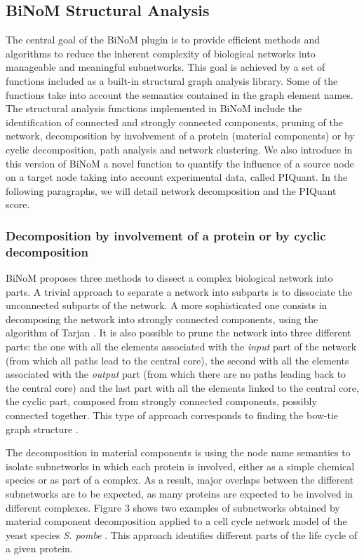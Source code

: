 \documentclass[10pt]{bmc_article}
\newenvironment{bmcformat}{\baselineskip20pt\sloppy\setboolean{publ}{false}}{\baselineskip20pt\sloppy}
\begin{document}
\begin{bmcformat}
\subsection*{BiNoM Structural Analysis}
The central goal of the BiNoM plugin is to provide efficient methods
and algorithms to reduce the inherent complexity of biological networks into
manageable and meaningful subnetworks. This goal is achieved by a set of
functions included as a built-in structural graph analysis library. Some of the functions take into
account the semantics contained in the graph element names.
The structural analysis functions implemented in BiNoM include the identification of
connected and strongly connected components, pruning of the network, decomposition
by involvement of a protein (material components) or by cyclic decomposition, path analysis and network clustering.
We also introduce in this version of BiNoM a novel function to quantify the
influence of a source node on a target node taking into account experimental
data, called PIQuant. In the following paragraphs, we will detail network
decomposition and the PIQuant score.

\subsubsection*{Decomposition by involvement of a protein or by cyclic decomposition}

BiNoM proposes three methods to dissect a complex biological network into parts.
A trivial approach to separate a network into subparts is to dissociate the unconnected subparts
of the network. A more sophisticated one consists in decomposing the network into
strongly connected components, using the algorithm of Tarjan
\cite{tarjan1972depth}. It is also possible to prune the network into three different parts:
the one with all the elements associated with the \emph{input} part of the network (from which all paths lead to the central core), the
second with all the elements associated with the \emph{output} part (from which there are no paths leading back to the central core) and the last
part with all the elements linked to the central core, the cyclic part, composed from strongly connected components, possibly connected together. 
This type of approach corresponds to finding the bow-tie graph structure \cite{broder2000graph}.

The decomposition in material components is using the node name semantics to
isolate subnetworks in which each protein is involved, either as a simple chemical species or as part of a complex. As a result, major overlaps between
the different subnetworks are to be expected, as many proteins are expected to be involved in
different complexes. Figure 3 shows two examples of subnetworks
obtained by material component decomposition applied to a cell cycle network
model of the yeast species \textit{S. pombe} \cite{novak1998model}. This approach identifies
different parts of the life cycle of a given protein.


\end{bmcformat}
\end{document}
